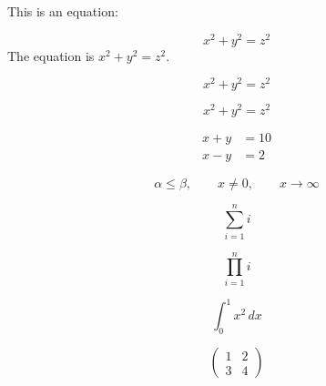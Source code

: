 \documentclass{article}
\begin{document}
This is an equation:

\[
x^2 + y^2 = z^2
\]
The equation is \(x^2 + y^2 = z^2\).

\begin{equation}
x^2 + y^2 = z^2
\end{equation}

\begin{equation*} %
x^2 + y^2 = z^2
\end{equation*}

\begin{align}
x + y &= 10 \\
x - y &= 2
\end{align}

\[
\alpha \leq \beta,\qquad x \neq 0,\qquad x \to \infty
\]

\[
\sum_{i=1}^{n} i
\]

\[
\prod_{i=1}^{n} i
\]

\[
\int_0^1 x^2\,dx
\]

\[
\begin{pmatrix}
1 & 2 \\
3 & 4
\end{pmatrix}
\]
\end{document}
